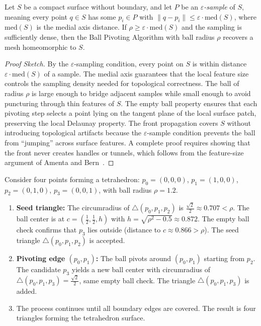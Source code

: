 \begin{theorem}\label{thm:bpa_topology}
Let $S$ be a compact surface without boundary, and let $P$ be an \emph{$\varepsilon$-sample} of $S$, meaning every point $q \in S$ has some $p_i \in P$ with $\|q - p_i\| \leq \varepsilon \cdot \text{med}(S)$, where $\text{med}(S)$ is the medial axis distance. If $\rho \geq \varepsilon \cdot \text{med}(S)$ and the sampling is sufficiently dense, then the Ball Pivoting Algorithm with ball radius $\rho$ recovers a mesh homeomorphic to $S$.
\end{theorem}

\begin{proof}[Proof Sketch]
By the $\varepsilon$-sampling condition, every point on $S$ is within distance $\varepsilon \cdot \text{med}(S)$ of a sample. The medial axis guarantees that the local feature size controls the sampling density needed for topological correctness. The ball of radius $\rho$ is large enough to bridge adjacent samples while small enough to avoid puncturing through thin features of $S$. The empty ball property ensures that each pivoting step selects a point lying on the tangent plane of the local surface patch, preserving the local Delaunay property. The front propagation covers $S$ without introducing topological artifacts because the $\varepsilon$-sample condition prevents the ball from ``jumping'' across surface features. A complete proof requires showing that the front never creates handles or tunnels, which follows from the feature-size argument of Amenta and Bern~\cite{amenta1998}.
\end{proof}

\begin{example}\label{ex:bpa_four_points}
Consider four points forming a tetrahedron: $p_0 = (0,0,0)$, $p_1 = (1,0,0)$, $p_2 = (0,1,0)$, $p_3 = (0,0,1)$, with ball radius $\rho = 1.2$.
\begin{enumerate}
\item \textbf{Seed triangle:} The circumradius of $\triangle(p_0, p_1, p_2)$ is $\frac{\sqrt{2}}{2} \approx 0.707 < \rho$. The ball center is at $c = (\frac{1}{2}, \frac{1}{2}, h)$ with $h = \sqrt{\rho^2 - 0.5} \approx 0.872$. The empty ball check confirms that $p_3$ lies outside (distance to $c \approx 0.866 > \rho$). The seed triangle $\triangle(p_0, p_1, p_2)$ is accepted.
\item \textbf{Pivoting edge $(p_0, p_1)$:} The ball pivots around $(p_0, p_1)$ starting from $p_2$. The candidate $p_3$ yields a new ball center with circumradius of $\triangle(p_0, p_1, p_3) = \frac{\sqrt{2}}{2}$, same empty ball check. The triangle $\triangle(p_0, p_1, p_3)$ is added.
\item The process continues until all boundary edges are covered. The result is four triangles forming the tetrahedron surface.
\end{enumerate}
\end{example}

